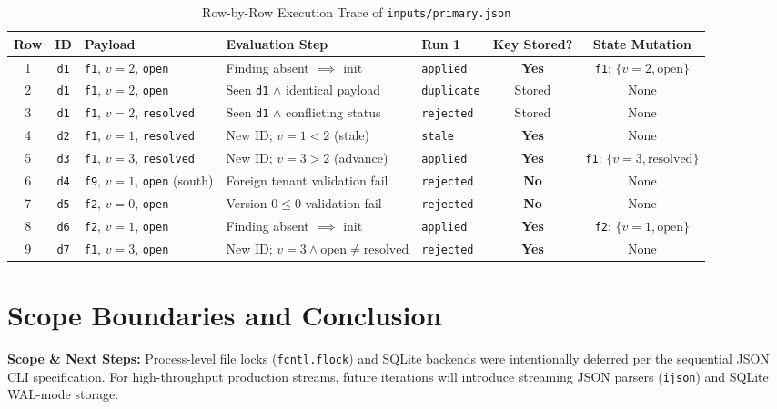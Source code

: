 \documentclass[10pt,a4paper]{article}
\begin{document}
\begin{table}[htbp]
\centering\footnotesize
\renewcommand{\arraystretch}{1.12}
\caption{Row-by-Row Execution Trace of \texttt{inputs/primary.json}}
\label{tab:row_trace}
\begin{tabularx}{\textwidth}{@{}cclXlcc@{}}
\toprule
\textbf{Row} & \textbf{ID} & \textbf{Payload} & \textbf{Evaluation Step} & \textbf{Run 1} & \textbf{Key Stored?} & \textbf{State Mutation} \\ \midrule
1 & \texttt{d1} & \texttt{f1}, $v=2$, \texttt{open} & Finding absent $\implies$ init & \texttt{applied} & \textbf{Yes} & \texttt{f1}: $\{v=2, \text{open}\}$ \\
2 & \texttt{d1} & \texttt{f1}, $v=2$, \texttt{open} & Seen \texttt{d1} $\land$ identical payload & \texttt{duplicate} & Stored & None \\
3 & \texttt{d1} & \texttt{f1}, $v=2$, \texttt{resolved} & Seen \texttt{d1} $\land$ conflicting status & \texttt{rejected} & Stored & None \\
4 & \texttt{d2} & \texttt{f1}, $v=1$, \texttt{resolved} & New ID; $v=1 < 2$ (stale) & \texttt{stale} & \textbf{Yes} & None \\
5 & \texttt{d3} & \texttt{f1}, $v=3$, \texttt{resolved} & New ID; $v=3 > 2$ (advance) & \texttt{applied} & \textbf{Yes} & \texttt{f1}: $\{v=3, \text{resolved}\}$ \\
6 & \texttt{d4} & \texttt{f9}, $v=1$, \texttt{open} (south) & Foreign tenant validation fail & \texttt{rejected} & \textbf{No} & None \\
7 & \texttt{d5} & \texttt{f2}, $v=0$, \texttt{open} & Version $0 \le 0$ validation fail & \texttt{rejected} & \textbf{No} & None \\
8 & \texttt{d6} & \texttt{f2}, $v=1$, \texttt{open} & Finding absent $\implies$ init & \texttt{applied} & \textbf{Yes} & \texttt{f2}: $\{v=1, \text{open}\}$ \\
9 & \texttt{d7} & \texttt{f1}, $v=3$, \texttt{open} & New ID; $v=3 \land \text{open} \neq \text{resolved}$ & \texttt{rejected} & \textbf{Yes} & None \\ \bottomrule
\end{tabularx}
\end{table}

\section{Scope Boundaries and Conclusion}

\textbf{Scope \& Next Steps:} Process-level file locks (\texttt{fcntl.flock}) and SQLite backends were intentionally deferred per the sequential JSON CLI specification. For high-throughput production streams, future iterations will introduce streaming JSON parsers (\texttt{ijson}) and SQLite WAL-mode storage.
\end{document}

